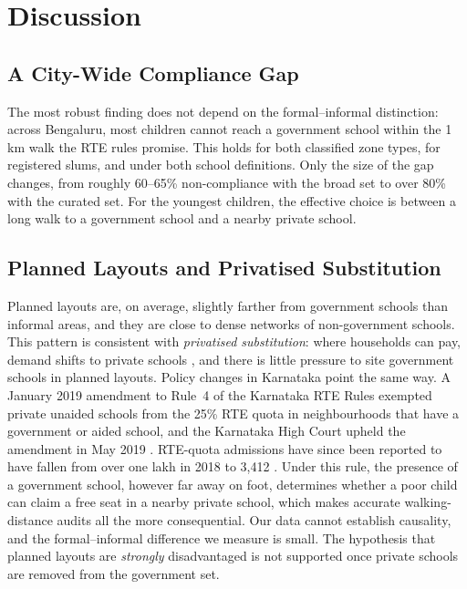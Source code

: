 \documentclass[conference]{IEEEtran}
\newcommand{\km}{\,km}
\begin{document}
\section{Discussion}\label{sec:discussion}
\subsection{A City-Wide Compliance Gap}
The most robust finding does not depend on the formal--informal distinction: across Bengaluru, most children cannot reach a government school within the 1\km{} walk the RTE rules promise. This holds for both classified zone types, for registered slums, and under both school definitions. Only the size of the gap changes, from roughly 60--65\% non-compliance with the broad set to over 80\% with the curated set. For the youngest children, the effective choice is between a long walk to a government school and a nearby private school.

\subsection{Planned Layouts and Privatised Substitution}
Planned layouts are, on average, slightly farther from government schools than informal areas, and they are close to dense networks of non-government schools. This pattern is consistent with \emph{privatised substitution}: where households can pay, demand shifts to private schools \cite{kingdon2020}, and there is little pressure to site government schools in planned layouts. Policy changes in Karnataka point the same way. A January 2019 amendment to Rule~4 of the Karnataka RTE Rules exempted private unaided schools from the 25\% RTE quota in neighbourhoods that have a government or aided school, and the Karnataka High Court upheld the amendment in May 2019 \cite{hc2019}. RTE-quota admissions have since been reported to have fallen from over one lakh in 2018 to 3,412 \cite{tnie2026}. Under this rule, the presence of a government school, however far away on foot, determines whether a poor child can claim a free seat in a nearby private school, which makes accurate walking-distance audits all the more consequential. Our data cannot establish causality, and the formal--informal difference we measure is small. The hypothesis that planned layouts are \emph{strongly} disadvantaged is not supported once private schools are removed from the government set.
\end{document}

